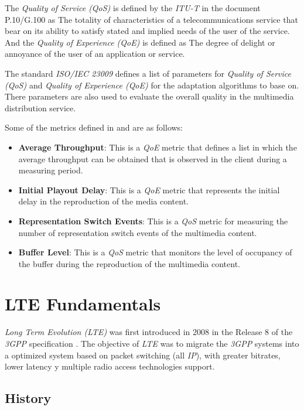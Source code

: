 The \textit{Quality of Service (QoS)} is defined by the \textit{ITU-T} in the document P.10/G.100
 \cite{itu2} as \textquotedbl The totality of characteristics of a telecommunications service that bear on its 
 ability to satisfy stated and implied needs of the user of the service\textquotedbl. And the \textit{Quality of 
Experience (QoE)} is defined as \textquotedbl The degree of delight or annoyance of the user of an application or service\textquotedbl.

The standard \textit{ISO/IEC 23009} defines a list of parameters for \textit{Quality of Service (QoS)} and
\textit{Quality of Experience (QoE)} for the adaptation algorithms to base on. There parameters 
are also used to evaluate the overall quality in the multimedia distribution service.

Some of the metrics defined in \cite{3gpp1} and \cite{ISO23009} are as follows:

\begin{itemize}
  \item \textbf{Average Throughput}: This is a \textit{QoE} metric that defines a list in which 
  the average throughput can be obtained that is observed in the client during a measuring period.
  \item \textbf{Initial Playout Delay}: This is a \textit{QoE} metric that represents the initial 
  delay in the reproduction of the media content.
  \item \textbf{Representation Switch Events}: This is a \textit{QoS} metric for measuring the 
  number of representation switch events of the multimedia content.
  \item \textbf{Buffer Level}: This is a \textit{QoS} metric that monitors the level of occupancy
  of the buffer during the reproduction of the multimedia content.
\end{itemize}


\section{LTE Fundamentals}
\label{sec:4g}

\textit{Long Term Evolution (LTE)} was first introduced in 2008 in the Release 8 of the \textit{3GPP}
specification \cite{lte1}. The objective of \textit{LTE} was to migrate the \textit{3GPP} systems
into a optimized system based on packet switching (all \textit{IP}), with greater bitrates, lower
latency y multiple radio access technologies support.

\subsection{History}
\label{sec:4gintro}

